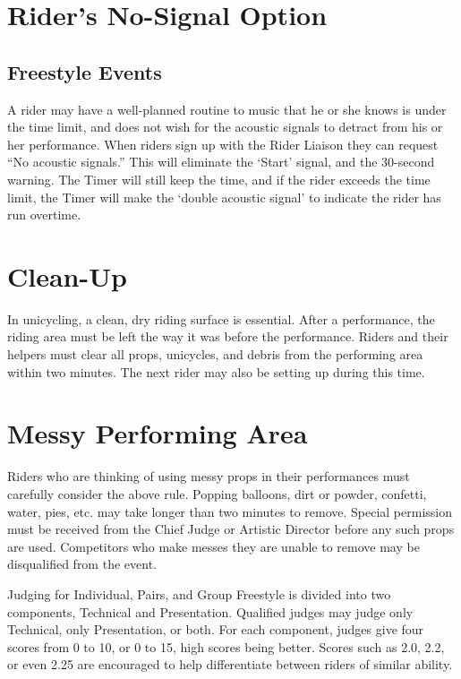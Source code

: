 \section{Rider's No-Signal Option}

\subsection{Freestyle Events}
A rider may have a well-planned routine to music that he or she knows is under the time limit, and does not wish for the acoustic signals to detract from his or her performance.
When riders sign up with the Rider Liaison they can request ``No acoustic signals.'' This will eliminate the ‘Start' signal, and the 30-second warning.
The Timer will still keep the time, and if the rider exceeds the time limit, the Timer will make the ‘double acoustic signal' to indicate the rider has run overtime.

\section{Clean-Up}
In unicycling, a clean, dry riding surface is essential.
After a performance, the riding area must be left the way it was before the performance.
Riders and their helpers must clear all props, unicycles, and debris from the performing area within two minutes.
The next rider may also be setting up during this time.

\section{Messy Performing Area}
Riders who are thinking of using messy props in their performances must carefully consider the above rule.
Popping balloons, dirt or powder, confetti, water, pies, etc.
may take longer than two minutes to remove.
Special permission must be received from the Chief Judge or Artistic Director before any such props are used.
Competitors who make messes they are unable to remove may be disqualified from the event.

\newpage

Judging for Individual, Pairs, and Group Freestyle is divided into two components, Technical and Presentation.
Qualified judges may judge only Technical, only Presentation, or both.
For each component, judges give four scores from 0 to 10, or 0 to 15, high scores being better.
Scores such as 2.0, 2.2, or even 2.25 are encouraged to help differentiate between riders of similar ability.

